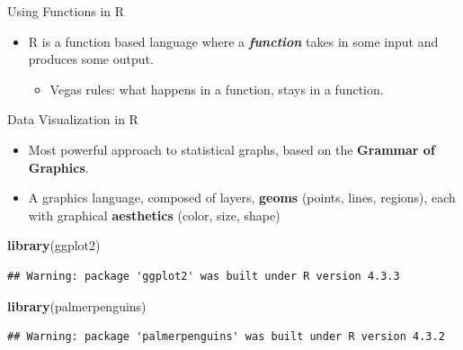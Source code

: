\documentclass[
  ignorenonframetext,
]{beamer}
\newenvironment{Shaded}{\begin{snugshade}}{\end{snugshade}}
\newcommand{\FunctionTok}[1]{\textcolor[rgb]{0.13,0.29,0.53}{\textbf{#1}}}
\newcommand{\NormalTok}[1]{#1}
\providecommand{\tightlist}{%
  \setlength{\itemsep}{0pt}\setlength{\parskip}{0pt}}
\begin{document}
\begin{frame}{Using Functions in R}
\label{using-functions-in-r}
\begin{itemize}
\tightlist
\item
  R is a function based language where a \textbf{\emph{function}} takes
  in some input and produces some output.

  \begin{itemize}
  \tightlist
  \item
    Vegas rules: what happens in a function, stays in a function.
  \end{itemize}
\end{itemize}
\end{frame}

\begin{frame}[fragile]{Data Visualization in R}
\label{data-visualization-in-r}
\begin{itemize}
\tightlist
\item
  Most powerful approach to statistical graphs, based on the
  \textbf{Grammar of Graphics}.
\end{itemize}

\begin{itemize}
\tightlist
\item
  A graphics language, composed of layers, \textbf{geoms} (points,
  lines, regions), each with graphical \textbf{aesthetics} (color, size,
  shape)
\end{itemize}

\begin{Shaded}
\begin{Highlighting}[]
\FunctionTok{library}\NormalTok{(ggplot2)}
\end{Highlighting}
\end{Shaded}

\begin{verbatim}
## Warning: package 'ggplot2' was built under R version 4.3.3
\end{verbatim}

\begin{Shaded}
\begin{Highlighting}[]
\FunctionTok{library}\NormalTok{(palmerpenguins)}
\end{Highlighting}
\end{Shaded}

\begin{verbatim}
## Warning: package 'palmerpenguins' was built under R version 4.3.2
\end{verbatim}
\end{frame}
\end{document}

